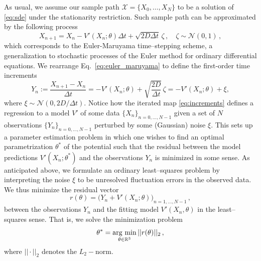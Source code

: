 As usual, we assume our sample path $\mathcal{X} = \{X_{0},\dots,X_{N}\}$ to be a solution of \eqref{eq:sde} under the stationarity restriction.
Such sample path can be approximated \cite[\S~$8.4$]{Lord2014} by the following process 
%
\begin{equation}\label{eq:euler_maruyama}
        X_{n+1} = X_{n} -V'(X_{n};\theta)\Delta t + \sqrt{2D\Delta t}\,\zeta\,,\quad \zeta\sim\mathcal{N}(0,1)\,,
\end{equation}
%
which corresponds to the Euler-Maruyama time--stepping scheme, a generalization to stochastic processes of the Euler method for ordinary differential equations.
We rearrange Eq.~\eqref{eq:euler_maruyama} to define the first-order time increments
%
\begin{equation}\label{eq:increments}
        Y_{n} := \frac{X_{n+1} - X_{n}}{\Delta t} = -V'(X_{n};\theta) + \sqrt{\frac{2D}{\Delta t}}\,\zeta = -V'(X_{n};\theta) + \xi ,
\end{equation}
%
where $\xi\sim\mathcal{N}(0,2D/\Delta t)$.
Notice how the iterated map \eqref{eq:increments} defines a regression to a model $V'$ of some data $\{X_{n}\}_{n=0,\dots,N-1}$ given a set of $N$ observations $\{Y_{n}\}_{n=0,\dots,N-1}$ perturbed by some (Gaussian) noise $\xi$.
This sets up a parameter estimation problem in which one wishes to find an optimal parametrization $\theta^*$ of the potential such that the residual between the model predictions $V'(X_{n};\theta^*)$ and the observations $Y_{n}$ is minimized in some sense.
As anticipated above, we formulate an ordinary least--squares problem by interpreting the noise $\xi$ to be unresolved fluctuation errors in the observed data.
We thus minimize the residual vector
%
\begin{equation}\label{eq:residual}
        r(\theta) = \big(Y_{n} + V'(X_{n};\theta)\big)_{n=1,\dots,N-1}\,,
\end{equation}
%
between the observations $Y_n$ and the fitting model $V'(X_n,\theta)$ in the least--squares sense.
That is, we solve the minimization problem
%
\begin{equation}\label{eq:lls_problem}
        \theta^{*} = \operatorname*{\arg\,min}_{\theta\in \mathbb{R}^{3}}||r(\theta)||_{2}\,,
\end{equation}
%
where $||\cdot||_2$ denotes the $L_2-$norm.
%
